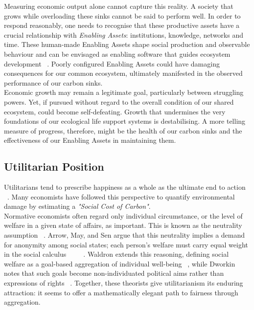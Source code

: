 \documentclass[10pt, oneside]{article}   	%
\begin{document}
Measuring economic output alone cannot capture this reality.
A society that grows while overloading these sinks cannot be said to perform well.
In order to respond reasonably, one needs to recognise that these productive assets have a crucial relationship with \emph{Enabling Assets}: institutions, knowledge, networks and time.
These human-made Enabling Assets shape social production and observable behaviour and can be envisaged as enabling software that guides ecosystem development ~\cite{pd3}.
Poorly configured Enabling Assets could have damaging consequences for our common ecosystem, ultimately manifested in the observed performance of our carbon sinks.\\

Economic growth may remain a legitimate goal, particularly between struggling powers.
Yet, if pursued without regard to the overall condition of our shared ecosystem, could become self-defeating.
Growth that undermines the very foundations of our ecological life support systems is destabilising.
A more telling measure of progress, therefore, might be the health of our carbon sinks and the effectiveness of our Enabling Assets in maintaining them.\\

\subsection{Utilitarian Position}

Utilitarians tend to prescribe happiness as a whole as the ultimate end to action ~\cite{hs1}.
Many economists have followed this perspective to quantify environmental damage by estimating a \emph{"Social Cost of Carbon"}.\\

Normative economists often regard only individual circumstance, or the level of welfare in a given state of affairs, as important.
This is known as the neutrality assumption ~\cite{pd2}.
Arrow, May, and Sen argue that this neutrality implies a demand for anonymity among social states; each person’s welfare must carry equal weight in the social calculus ~\cite{ka1} ~\cite{km1} ~\cite{as2}.
Waldron extends this reasoning, defining social welfare as a goal-based aggregation of individual well-being ~\cite{jw2}, while Dworkin notes that such goals become non-individuated political aims rather than expressions of rights ~\cite{rd1}.
Together, these theorists give utilitarianism its enduring attraction: it seems to offer a mathematically elegant path to fairness through aggregation.\\
\end{document}

